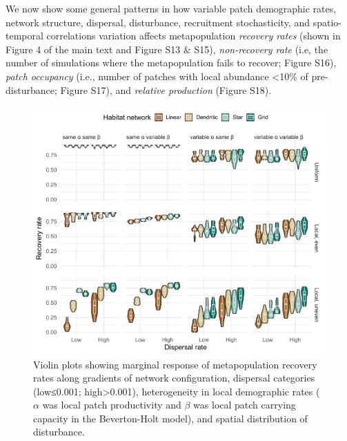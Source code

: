 \documentclass[
]{article}
\begin{document}
We now show some general patterns in how variable patch demographic
rates, network structure, dispersal, disturbance, recruitment
stochasticity, and spatio-temporal correlations variation affects
metapopulation \emph{recovery rates} (shown in Figure 4 of the main text
and Figure S13 \& S15), \emph{non-recovery rate} (i.e, the number of
simulations where the metapopulation fails to recover; Figure S16),
\emph{patch occupancy} (i.e., number of patches with local abundance
\textless10\% of pre-disturbance; Figure S17), and \emph{relative
production} (Figure S18).

\begin{figure}[H]

{\centering \includegraphics{Managing_for_ecological_surprises_in_metapopulations_files/figure-latex/violin plots of risk of recovery rates based on variable patch demographic rates-1} 

}

\caption{Violin plots showing marginal response of metapopulation recovery rates along gradients of network configuration, dispersal categories (low≤0.001; high>0.001), heterogeneity in local demographic rates ($\alpha$ was local patch productivity and $\beta$ was local patch carrying capacity in the Beverton-Holt model), and spatial distribution of disturbance.}\label{fig:violin plots of risk of recovery rates based on variable patch demographic rates}
\end{figure}
\end{document}
